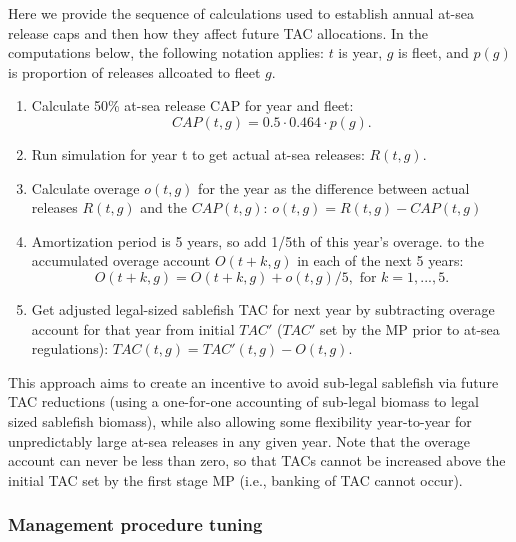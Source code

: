 \documentclass[11pt]{book}
\begin{document}
Here we provide the sequence of calculations used to establish annual at-sea release caps and then how they affect future TAC allocations. In the computations below, the following notation applies: \(t\) is year, \(g\) is fleet, and \(p(g)\) is proportion of releases allcoated to fleet \(g\).
\begin{enumerate}
\def\labelenumi{\arabic{enumi}.}

\item
  Calculate 50\% at-sea release CAP for year and fleet: \begin{equation*}
        CAP(t,g) = 0.5 \cdot 0.464 \cdot p(g).
  \end{equation*}
\item
  Run simulation for year t to get actual at-sea releases: \(R(t,g)\).
\item
  Calculate overage \(o(t,g)\) for the year as the difference between actual releases \(R(t,g)\) and the \(CAP(t,g)\): \(o(t,g) = R(t,g) - CAP(t,g)\)
\item
  Amortization period is 5 years, so add 1/5th of this year's overage. to the accumulated overage account \(O(t+k,g)\) in each of the next 5 years: \begin{equation*}
  O(t + k,g) = O(t+k,g) + o(t,g)/5, \mbox{ for } k = 1, ..., 5.
  \end{equation*}
\item
  Get adjusted legal-sized sablefish TAC for next year by subtracting overage account for that year from initial \(TAC'\) (\(TAC'\) set by the MP prior to at-sea regulations): \(TAC(t,g) = TAC'(t,g) - O(t,g)\).
\end{enumerate}
This approach aims to create an incentive to avoid sub-legal sablefish via future TAC reductions (using a one-for-one accounting of sub-legal biomass to legal sized sablefish biomass), while also allowing some flexibility year-to-year for unpredictably large at-sea releases in any given year. Note that the overage account can never be less than zero, so that TACs cannot be increased above the initial TAC set by the first stage MP (i.e., banking of TAC cannot occur).

\hypertarget{management-procedure-tuning}{%
\subsubsection{Management procedure tuning}\label{management-procedure-tuning}}
\end{document}
